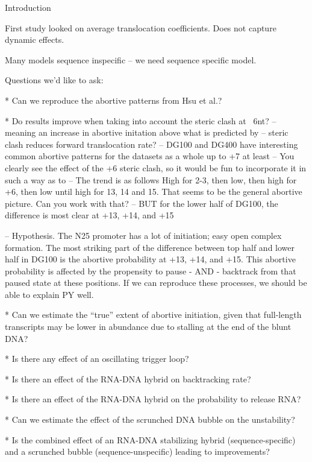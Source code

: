 Introduction

First study looked on average translocation coefficients. Does not capture
dynamic effects.

Many models sequence inspecific -- we need sequence specific model.

Questions we'd like to ask:

* Can we reproduce the abortive patterns from Hsu et al.?

* Do results improve when taking into account the steric clash at ~6nt?
    -- meaning an increase in abortive initation above what is predicted by
    -- steric clash reduces forward translocation rate?
    -- DG100 and DG400 have interesting common abortive patterns for the
    datasets as a whole up to +7 at least
    -- You clearly see the effect of the +6 steric clash, so it would be fun
       to incorporate it in such a way as to 
    -- The trend is as follows High for 2-3, then low, then high for +6, then
    low until high for 13, 14 and 15. That seems to be the general abortive
    picture. Can you work with that?
    -- BUT for the lower half of DG100, the difference is most clear at +13,
    +14, and +15

    -- Hypothesis. The N25 promoter has a lot of initiation; easy open complex
    formation. The most striking part of the difference between top half and
    lower half in DG100 is the abortive probability at +13, +14, and +15. This
    abortive probability is affected by the propensity to pause - AND -
    backtrack from that paused state at these positions. If we can reproduce
    these processes, we should be able to explain PY well.

* Can we estimate the ``true'' extent of abortive initiation, given that
  full-length transcripts may be lower in abundance due to stalling at the end of
  the blunt DNA?

* Is there any effect of an oscillating trigger loop?

* Is there an effect of the RNA-DNA hybrid on backtracking rate?

* Is there an effect of the RNA-DNA hybrid on the probability to release RNA?

* Can we estimate the effect of the scrunched DNA bubble on the unstability?

* Is the combined effect of an RNA-DNA stabilizing hybrid (sequence-specific)
  and a scrunched bubble (sequence-unspecific) leading to improvements?
